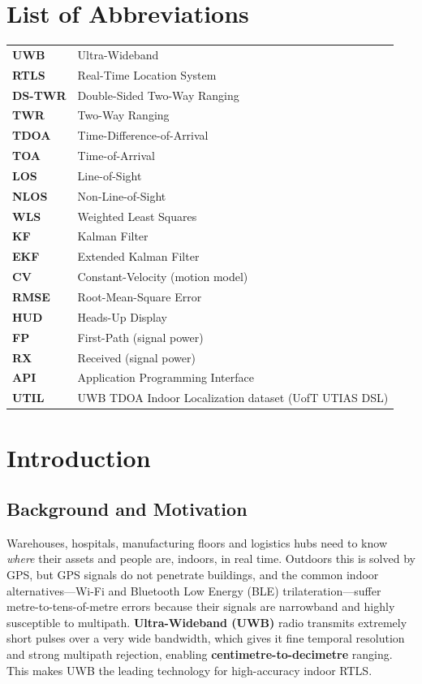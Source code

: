 \documentclass[a4paper,12pt,onecolumn]{report}
\begin{document}
\chapter*{List of Abbreviations}
\begin{longtable}{ l l }
\textbf{UWB}    & Ultra-Wideband \\
\textbf{RTLS}   & Real-Time Location System \\
\textbf{DS-TWR} & Double-Sided Two-Way Ranging \\
\textbf{TWR}    & Two-Way Ranging \\
\textbf{TDOA}   & Time-Difference-of-Arrival \\
\textbf{TOA}    & Time-of-Arrival \\
\textbf{LOS}    & Line-of-Sight \\
\textbf{NLOS}   & Non-Line-of-Sight \\
\textbf{WLS}    & Weighted Least Squares \\
\textbf{KF}     & Kalman Filter \\
\textbf{EKF}    & Extended Kalman Filter \\
\textbf{CV}     & Constant-Velocity (motion model) \\
\textbf{RMSE}   & Root-Mean-Square Error \\
\textbf{HUD}    & Heads-Up Display \\
\textbf{FP}     & First-Path (signal power) \\
\textbf{RX}     & Received (signal power) \\
\textbf{API}    & Application Programming Interface \\
\textbf{UTIL}   & UWB TDOA Indoor Localization dataset (UofT UTIAS DSL) \\
\end{longtable}

\newpage
{}

\chapter{Introduction}

\section{Background and Motivation}
Warehouses, hospitals, manufacturing floors and logistics hubs need to know
\emph{where} their assets and people are, indoors, in real time. Outdoors this is
solved by GPS, but GPS signals do not penetrate buildings, and the common indoor
alternatives---Wi-Fi and Bluetooth Low Energy (BLE) trilateration---suffer
metre-to-tens-of-metre errors because their signals are narrowband and highly
susceptible to multipath. \textbf{Ultra-Wideband (UWB)} radio transmits
extremely short pulses over a very wide bandwidth, which gives it fine temporal
resolution and strong multipath rejection, enabling \textbf{centimetre-to-decimetre}
ranging. This makes UWB the leading technology for high-accuracy indoor RTLS.
\end{document}
